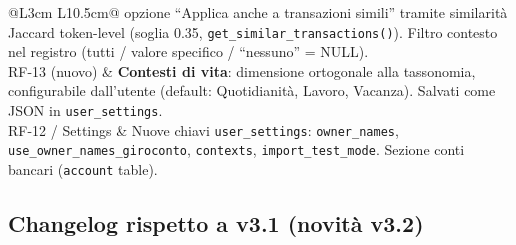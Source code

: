 \documentclass[11pt, a4paper]{article}
\begin{document}
\begin{center}
\begin{longtable}{@{}L{3cm} L{10.5cm}@{}}
                       opzione ``Applica anche a transazioni simili'' tramite
                       similarità Jaccard token-level (soglia 0.35,
                       \texttt{get\_similar\_transactions()}). Filtro contesto nel
                       registro (tutti / valore specifico / ``nessuno'' = NULL). \\[3pt]
RF-13 (nuovo)       & \textbf{Contesti di vita}: dimensione ortogonale alla tassonomia,
                       configurabile dall'utente (default: Quotidianità, Lavoro, Vacanza).
                       Salvati come JSON in \texttt{user\_settings}. \\[3pt]
RF-12 / Settings    & Nuove chiavi \texttt{user\_settings}: \texttt{owner\_names},
                       \texttt{use\_owner\_names\_giroconto}, \texttt{contexts},
                       \texttt{import\_test\_mode}. Sezione conti bancari
                       (\texttt{account} table). \\
\bottomrule
\end{longtable}
\end{center}

\subsection*{Changelog rispetto a v3.1 (novità v3.2)}
\end{document}
